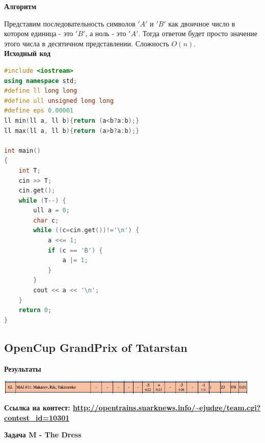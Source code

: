\documentclass[a4paper,12pt]{article}
\begin{document}
\newpage
\textbf{{\large Алгоритм}}

Представим последовательность символов $'A'$ и $'B'$ как двоичное число в котором единица - это $'B'$, а ноль - это $'A'$. Тогда ответом будет просто значение этого числа в десятичном представлении. Сложность $O(n)$. \\

\textbf{{\large Исходный код}} \\
\begin{lstlisting}[language=C++]
#include <iostream>
using namespace std;
#define ll long long
#define ull unsigned long long
#define eps 0.00001
ll min(ll a, ll b){return (a<b?a:b);}
ll max(ll a, ll b){return (a>b?a:b);}

int main()
{
    int T;
    cin >> T;
    cin.get();
    while (T--) {
        ull a = 0;
        char c;
        while ((c=cin.get())!='\n') {
            a <<= 1;
            if (c == 'B') {
                a |= 1;
            }
        }
        cout << a << '\n';
    }
    return 0;
}
\end{lstlisting}



%
%
\newpage
\subsection{OpenCup GrandPrix of Tatarstan}

\textbf{{\large Результаты}} \\
\begin{center}
\includegraphics[width=0.95\textwidth]{OC_Tatarstan/OC_Tatarstan_result.png}\\ [1cm]
\end{center}

\textbf{{\large Ссылка на контест: \url{http://opentrains.snarknews.info/~ejudge/team.cgi?contest_id=10301}}}

\newpage
\textbf{{\large Задача M - The Dress}}
\end{document}
